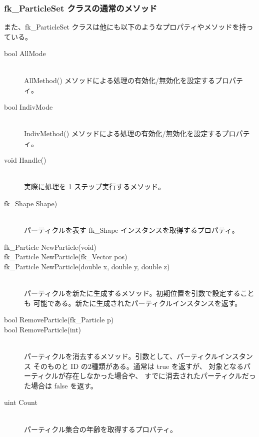 \subsubsection{fk\_ParticleSet クラスの通常のメソッド}
また、fk\_ParticleSet クラスは他にも以下のようなプロパティやメソッドを持っている。
\begin{description}
\item[bool AllMode] ~ \\
	AllMethod() メソッドによる処理の有効化/無効化を設定するプロパティ。\\

\item[bool IndivMode] ~ \\
	IndivMethod() メソッドによる処理の有効化/無効化を設定するプロパティ。\\

\item[void Handle()] ~ \\
	実際に処理を 1 ステップ実行するメソッド。\\

\item[fk\_Shape Shape)] ~ \\
	パーティクルを表す fk\_Shape インスタンスを取得するプロパティ。\\

\item[fk\_Particle NewParticle(void)]
\item[fk\_Particle NewParticle(fk\_Vector pos)]
\item[fk\_Particle NewParticle(double x, double y, double z)] ~ \\
	パーティクルを新たに生成するメソッド。初期位置を引数で設定することも
	可能である。新たに生成されたパーティクルインスタンスを返す。\\

\item[bool RemoveParticle(fk\_Particle p)]
\item[bool RemoveParticle(int)] ~ \\
	パーティクルを消去するメソッド。引数として、パーティクルインスタンス
	そのものと ID の2種類がある。通常は true を返すが、
	対象となるパーティクルが存在しなかった場合や、
	すでに消去されたパーティクルだった場合は false を返す。\\

\item[uint Count] ~ \\
	パーティクル集合の年齢を取得するプロパティ。\\


\end{description}
